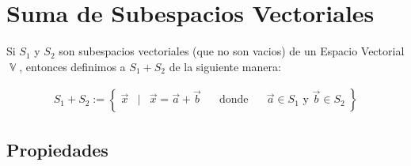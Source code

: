 \documentclass[12pt, fleqn]{report}                             %
\DeclareMathOperator \Space {\quad}                             %
\DeclareMathOperator \MiniSpace {\;}                            %
\newcommand \Such {\MiniSpace | \MiniSpace}                     %
\theoremstyle{break}                                            %
\DeclareMathOperator \VectorSet    {\mathbb{V}}                 %
\newcommand{\Set}[1]    {\left\{ \; #1 \; \right\}}             %
\begin{document}
        \clearpage
        \section{Suma de Subespacios Vectoriales}

            Si $S_1$ y $S_2$ son subespacios vectoriales (que no son vacios) de un Espacio Vectorial
            $\VectorSet$, entonces definimos a $S_1 + S_2$ de la siguiente manera:

            \begin{align}
                S_1 + S_2 := \Set{
                    \vec x 
                        \Such \vec x = \vec{a} + \vec{b} 
                        \Space \text{donde} \Space
                        \vec{a} \in S_1 \text{ y }
                        \vec{b} \in S_2
                    }
            \end{align}


            \vspace{1em}
            \subsection{Propiedades}
\end{document}
